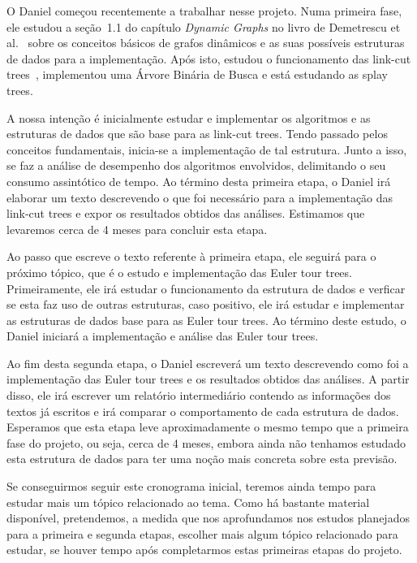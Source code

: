 \documentclass[12pt]{article}
\begin{document}
O Daniel começou recentemente a trabalhar nesse projeto. Numa primeira
fase, ele estudou a seção~1.1 do capítulo \emph{Dynamic Graphs} no livro de 
Demetrescu et al.~\cite{DemetrescuFI2004} sobre os conceitos básicos de grafos 
dinâmicos e as suas possíveis estruturas de dados para a implementação. 
Após isto, estudou o funcionamento das link-cut trees~\cite{DemaineHJSI2012}, 
implementou uma Árvore Binária de Busca e está estudando as splay trees.

A nossa intenção é
inicialmente estudar e implementar os algoritmos e as estruturas de dados que são base para as link-cut trees. 
Tendo passado pelos conceitos fundamentais, inicia-se a implementação de tal estrutura.
Junto a isso, se faz a análise de desempenho dos algoritmos envolvidos, 
delimitando o seu consumo assintótico de tempo.
Ao término desta primeira etapa, o Daniel irá elaborar um texto descrevendo o que foi necessário para a implementação das link-cut trees e expor os resultados obtidos das análises.
Estimamos que levaremos cerca de 4 meses para concluir esta etapa. 

Ao passo que escreve o texto referente à primeira etapa, ele seguirá para o próximo tópico, que é o estudo e implementação das Euler tour trees. Primeiramente, ele irá estudar o funcionamento da estrutura de dados e verficar se esta faz uso de outras estruturas, caso positivo, ele irá estudar e implementar as estruturas de dados base para as Euler tour trees. Ao término deste estudo, o Daniel iniciará a implementação e análise das Euler tour trees. 

Ao fim desta segunda etapa, o Daniel escreverá um texto descrevendo como foi a implementação das Euler tour trees e os resultados obtidos das análises. A partir disso, ele irá escrever um relatório intermediário contendo as informações dos textos já escritos e irá comparar o comportamento de cada estrutura de dados.  Esperamos que esta etapa leve aproximadamente o mesmo tempo que a primeira fase do projeto, ou seja, cerca de 4 meses, embora ainda não tenhamos estudado esta estrutura de dados para ter uma noção mais concreta sobre esta previsão.  

Se conseguirmos seguir este cronograma inicial, teremos ainda tempo para estudar mais um tópico relacionado ao tema.  Como há bastante material disponível, pretendemos, a medida que nos aprofundamos nos estudos planejados para a primeira e segunda etapas, escolher mais algum tópico relacionado para estudar, se houver tempo após completarmos estas primeiras etapas do projeto.
\end{document}
